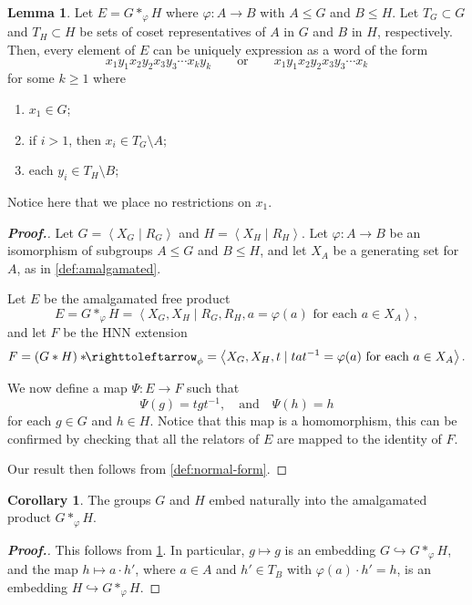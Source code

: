 \documentclass[11pt,a4paper,reqno]{amsart}
\theoremstyle{plain}
\theoremstyle{definition}
\newtheorem{lemma}[theorem]{Lemma}
\newtheorem{corollary}{Corollary}[theorem]
\theoremstyle{definition}
\renewcommand\leq\leqslant
\renewcommand\geq\geqslant
\newenvironment{myproof}{\begin{proof}[\normalfont\bfseries Proof.]}{\end{proof}}
\newcommand\hnn{*\!\!\righttoleftarrow}
\begin{document}
\begin{lemma}\label{lem:amalgamated-normal-form}
	Let $E = G *_\varphi H$ where $\varphi\colon A\to B$ with $A\leq G$ and $B \leq H$.
	Let $T_G\subset G$ and $T_H \subset H$ be sets of coset representatives of $A$ in $G$ and $B$ in $H$, respectively.
	Then, every element of $E$ can be uniquely expression as a word of the form
	\[
		x_1 y_1 x_2 y_2 x_3 y_3 \cdots x_k y_k
		\qquad\text{or}\qquad
		x_1 y_1 x_2 y_2 x_3 y_3 \cdots x_k
	\]
	for some $k \geq 1$ where
	\begin{enumerate}
		\item $x_1 \in G$;
		\item if $i > 1$, then $x_i \in T_G\setminus A$;
		\item each $y_i \in T_H\setminus B$;
	\end{enumerate}
	Notice here that we place no restrictions on $x_1$.
\end{lemma}

\begin{myproof}
  Let $G = \left\langle X_G \mid R_G\right\rangle$ and $H = \left\langle X_H \mid R_H\right\rangle$.
  Let $\varphi\colon A\to B$ be an isomorphism of subgroups $A\leq G$ and $B\leq H$, and let $X_A$ be a generating set for $A$, as in \cref{def:amalgamated}.

  Let $E$ be the amalgamated free product
  \[
		E = G*_\varphi H
		=
		\left\langle X_G, X_H
		\mid
		R_G, R_H, a = \varphi(a)\text{ for each }a\in X_A
		\right\rangle,
  \]
	and let $F$ be the HNN extension
	\[
		F
		=
		(G * H)\hnn_{\phi}
		=
		\left\langle
		X_G, X_H,t
		\mid
		t a t^{-1} = \varphi(a) \text{ for each }a\in X_A
		\right\rangle.
	\]

	We now define a map $\Psi\colon E\to F$ such that
	\[
		\Psi(g) = t g t^{-1},\quad
		\text{and}\quad
		\Psi(h) = h
	\]
	for each $g\in G$ and $h\in H$.
  Notice that this map is a homomorphism, this can be confirmed by checking that all the relators of $E$ are mapped to the identity of $F$.
  
  Our result then follows from \cref{def:normal-form}.
\end{myproof}

\begin{corollary}\label{cor:natural-embed}
	The groups $G$ and $H$ embed naturally into the amalgamated product $G*_\varphi H$.
\end{corollary}

\begin{myproof}
  This follows from \cref{lem:amalgamated-normal-form}.
  In particular, $g\mapsto g$ is an embedding $G \hookrightarrow G*_\varphi H$, and
  the map $h\mapsto a\cdot h'$, where $a\in A$ and $h' \in T_B$ with $\varphi(a)\cdot h' =h$, is an embedding $H \hookrightarrow G*_\varphi H$.
\end{myproof}
\end{document}
